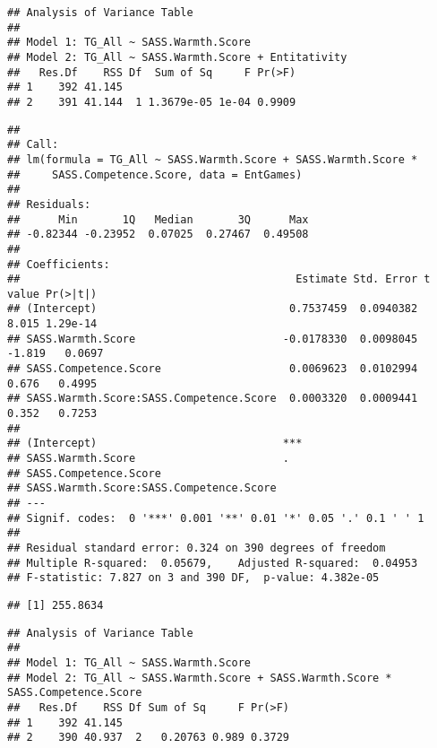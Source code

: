 \documentclass[
  doc,draftall]{apa6}
\begin{document}
\begin{verbatim}
## Analysis of Variance Table
## 
## Model 1: TG_All ~ SASS.Warmth.Score
## Model 2: TG_All ~ SASS.Warmth.Score + Entitativity
##   Res.Df    RSS Df  Sum of Sq     F Pr(>F)
## 1    392 41.145                           
## 2    391 41.144  1 1.3679e-05 1e-04 0.9909
\end{verbatim}

\begin{verbatim}
## 
## Call:
## lm(formula = TG_All ~ SASS.Warmth.Score + SASS.Warmth.Score * 
##     SASS.Competence.Score, data = EntGames)
## 
## Residuals:
##      Min       1Q   Median       3Q      Max 
## -0.82344 -0.23952  0.07025  0.27467  0.49508 
## 
## Coefficients:
##                                           Estimate Std. Error t value Pr(>|t|)
## (Intercept)                              0.7537459  0.0940382   8.015 1.29e-14
## SASS.Warmth.Score                       -0.0178330  0.0098045  -1.819   0.0697
## SASS.Competence.Score                    0.0069623  0.0102994   0.676   0.4995
## SASS.Warmth.Score:SASS.Competence.Score  0.0003320  0.0009441   0.352   0.7253
##                                            
## (Intercept)                             ***
## SASS.Warmth.Score                       .  
## SASS.Competence.Score                      
## SASS.Warmth.Score:SASS.Competence.Score    
## ---
## Signif. codes:  0 '***' 0.001 '**' 0.01 '*' 0.05 '.' 0.1 ' ' 1
## 
## Residual standard error: 0.324 on 390 degrees of freedom
## Multiple R-squared:  0.05679,    Adjusted R-squared:  0.04953 
## F-statistic: 7.827 on 3 and 390 DF,  p-value: 4.382e-05
\end{verbatim}

\begin{verbatim}
## [1] 255.8634
\end{verbatim}

\begin{verbatim}
## Analysis of Variance Table
## 
## Model 1: TG_All ~ SASS.Warmth.Score
## Model 2: TG_All ~ SASS.Warmth.Score + SASS.Warmth.Score * SASS.Competence.Score
##   Res.Df    RSS Df Sum of Sq     F Pr(>F)
## 1    392 41.145                          
## 2    390 40.937  2   0.20763 0.989 0.3729
\end{verbatim}
\end{document}
